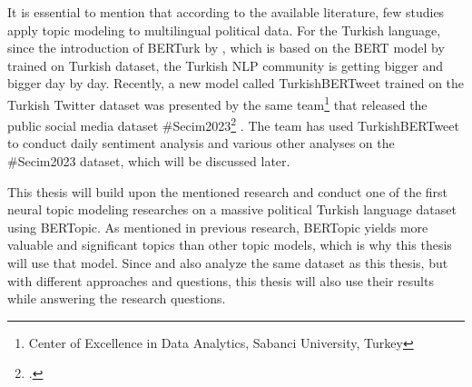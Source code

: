 It is essential to mention that according to the available literature, few studies 
apply topic modeling to multilingual political data. For the Turkish language, 
since the introduction of BERTurk by \textcite{schweter_berturk_2020}, which is 
based on the BERT model by \textcite{devlin_bert_2019} trained on Turkish dataset,
the Turkish NLP community is getting bigger and bigger day by day. 
Recently, a new model called TurkishBERTweet trained on the Turkish Twitter dataset 
was presented by the same team\footnote{Center of Excellence in Data Analytics, Sabanci University, Turkey} 
that released the public social media dataset \#Secim2023\footcite{secim2023} \parencite{turkishbertweet_2023}. 
The team has used TurkishBERTweet to conduct daily sentiment analysis and 
various other analyses on the \#Secim2023 dataset, which will be discussed later.

This thesis will build upon the mentioned research and conduct one of the first 
neural topic modeling researches on a massive political Turkish language dataset using BERTopic. 
As mentioned in previous research, BERTopic yields more valuable and significant topics than 
other topic models, which is why this thesis will use that model.
Since \textcite{turkishbertweet_2023} and also \textcite{secim2023} analyze the same dataset 
as this thesis, but with different approaches and questions, this thesis will also use their 
results while answering the research questions.


